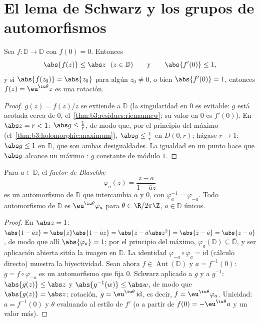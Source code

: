 \section{El lema de Schwarz y los grupos de automorfismos}

\begin{theorem}\label{thm:b3:conformal:schwarz}
Sea $f \colon \mathbb D \to \mathbb D$
 con $f(0) = 0$.
Entonces
\[
\abs{f(z)} \leq \abs z \ \ (z \in \mathbb D)
\qquad\text{y}\qquad \abs{f'(0)} \leq 1 ,
\]
y si $\abs{f(z_0)} = \abs{z_0}$ para algún $z_0 \neq 0$, o bien
$\abs{f'(0)} = 1$, entonces $f(z) = \eu^{\iu\theta}z$ es una rotación.
\end{theorem}

\begin{proof}
$g(z) = f(z)/z$ se extiende
 a $\mathbb D$ (la
singularidad en $0$ es evitable: $g$ está acotada cerca de $0$,
el~\cref{thm:b3:residues:riemanncw}; su valor en $0$ es $f'(0)$). En
$\abs z = r < 1$: $\abs g \leq \frac1r$, de modo que, por el principio
del máximo (el~\cref{thm:b3:holomorphic:maximum}), $\abs g \leq \frac1r$
en $\bar D(0,r)$; hágase $r \to 1$: $\abs
g \leq 1$ en $\mathbb D$, que son ambas desigualdades. La igualdad en un
punto  hace que $\abs g$
alcance un máximo : $g$
constante de módulo $1$.
\end{proof}

\begin{theorem}
\label{thm:b3:conformal:autdisc}
Para $a \in \mathbb D$, el \emph{factor de Blaschke}
\[
\varphi_a(z) = \frac{z - a}{1 - \bar a z}
\]
es un automorfismo de $\mathbb D$ que intercambia $a$ y $0$, con
$\varphi_a^{-1} = \varphi_{-a}$. Todo automorfismo de $\mathbb D$ es
$\eu^{\iu\theta}\varphi_a$ para $\theta
\in \R/2\pi\Z$, $a \in \mathbb D$ únicos.
\end{theorem}

\begin{proof}
En $\abs z = 1$: $\abs{1 - \bar az} = \abs{\bar z}\abs{1 -
\bar az} = \abs{\bar z - \bar a\abs z^2} = \abs{\bar z - \bar
a} = \abs{z - a}$, de modo que allí $\abs{\varphi_a} = 1$; por el
principio del máximo, $\varphi_a(\mathbb D) \subseteq \bar{\mathbb
D}$, y ser aplicación abierta sitúa la imagen en $\mathbb D$. La
identidad 
$\varphi_{-a}\circ\varphi_a = \mathrm{id}$ (cálculo directo) muestra la
biyectividad. Sean ahora $f \in
\operatorname{Aut}(\mathbb D)$ y $a = f^{-1}(0)$: $g =
f\circ\varphi_{-a}$ es un automorfismo que fija $0$. Schwarz aplicado a
$g$ y a $g^{-1}$: $\abs{g(z)} \leq \abs z$ y
$\abs{g^{-1}(w)} \leq \abs w$, de modo que $\abs{g(z)} = \abs z$:
rotación, $g = \eu^{\iu\theta}\,\mathrm{id}$, es decir, $f =
\eu^{\iu\theta}\varphi_a$. Unicidad: $a = f^{-1}(0)$ y $\theta$
evaluando al estilo de $f'$ (o a partir de $f(0) =
-\eu^{\iu\theta}a$ y un valor más).
\end{proof}

